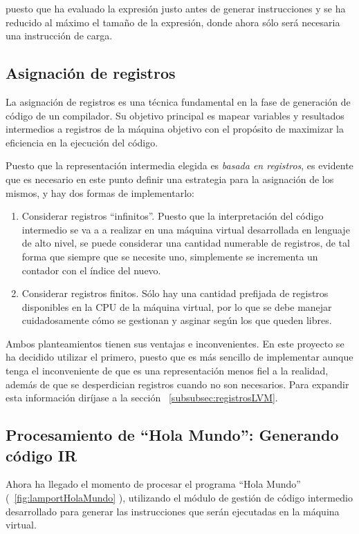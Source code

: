 puesto que ha evaluado la expresión justo antes de generar instrucciones y se ha reducido al máximo el tamaño de la expresión, donde ahora sólo será necesaria una instrucción de carga.

\subsection{Asignación de registros}\label{subsec:asignacionRegIR}
La asignación de registros es una técnica fundamental en la fase de generación de código de un compilador. Su objetivo principal es mapear variables y resultados intermedios a registros de la máquina objetivo con el propósito de maximizar la eficiencia en la ejecución del código.


Puesto que la representación intermedia elegida es \textit{basada en registros}, es evidente que es necesario en este punto definir una estrategia para la asignación de los mismos, y hay dos formas de implementarlo:

\begin{enumerate}
    \item Considerar registros ``infinitos''. Puesto que la interpretación del código intermedio se va a a realizar en una máquina virtual desarrollada en lenguaje de alto nivel, se puede considerar una cantidad numerable de registros, de tal forma que siempre que se necesite uno, simplemente se incrementa un contador con el índice del nuevo.
    \item Considerar registros finitos. Sólo hay una cantidad prefijada de registros disponibles en la CPU de la máquina virtual, por lo que se debe manejar cuidadosamente cómo se gestionan y asginar según los que queden libres.
\end{enumerate}

Ambos planteamientos tienen sus ventajas e inconvenientes. En este proyecto se ha decidido utilizar el primero, puesto que es más sencillo de implementar aunque tenga el inconveniente de que es una representación menos fiel a la realidad, además de que se desperdician registros cuando no son necesarios. Para expandir esta información diríjase a la sección ~\ref{subsubsec:registrosLVM}.

\subsection{Procesamiento de ``Hola Mundo'': Generando código IR}
Ahora ha llegado el momento de procesar el programa ``Hola Mundo'' (~\ref{fig:lamportHolaMundo} ), utilizando el módulo de gestión de código intermedio desarrollado para generar las instrucciones que serán ejecutadas en la máquina virtual.

